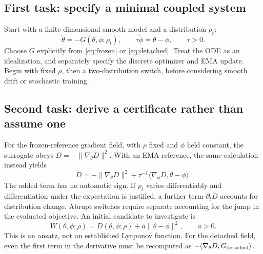 \documentclass[11pt,a4paper]{article}
\newif\ifdraftnotes
\newcommand{\draftnote}[1]{\ifdraftnotes\par\smallskip
  {\small\color{gray}\noindent\textit{To develop:} #1\par}\smallskip\fi}
\begin{document}
\subsection{First task: specify a minimal coupled system}
Start with a finite-dimensional smooth model and a distribution $\rho_t$:
\begin{equation}
 \dot\theta=-G(\theta,\phi;\rho_t),\qquad
 \tau\dot\phi=\theta-\phi,\qquad \tau>0.
 \label{eq:teacher}
\end{equation}
Choose $G$ explicitly from \eqref{eq:frozen} or \eqref{eq:detached}.
Treat the ODE as an idealization, and separately specify the discrete
optimizer and EMA update. Begin with fixed $\rho$, then a two-distribution
switch, before considering smooth drift or stochastic training.
\draftnote{Choose a scalar or low-dimensional affine model whose shared
parameters couple predictions on old and new inputs. Avoid a model in
which each input can adapt independently. State the adapted parameters
and the pretrained initialization.}

\subsection{Second task: derive a certificate rather than assume one}
For the frozen-reference gradient field, with $\rho$ fixed and $\phi$ held
constant, the surrogate obeys $\dot D=-\|\nabla_\theta D\|^2$.
With an EMA reference, the same calculation instead yields
\begin{equation}
 \dot D=-\|\nabla_\theta D\|^2
 +\tau^{-1}\langle\nabla_\phi D,\theta-\phi\rangle.
 \label{eq:emaenergy}
\end{equation}
The added term has no automatic sign. If $\rho_t$ varies differentiably and
differentiation under the expectation is justified, a further term
$\partial_tD$ accounts for distribution change. Abrupt switches require
separate accounting for the jump in the evaluated objective.
An initial candidate to investigate is
\begin{equation}
 W(\theta,\phi;\rho)
 =D(\theta,\phi;\rho)+a\|\theta-\phi\|^2,\qquad a>0.
 \label{eq:composite}
\end{equation}
This is an ansatz, not an established Lyapunov function. For the detached
field, even the first term in the derivative must be recomputed as
$-\langle\nabla_\theta D,G_{\rm detached}\rangle$.
\draftnote{Compute equilibria and the full Jacobian in the chosen toy model.
Determine whether a local certificate, a tracking bound, or a counterexample
is the most informative first result. Check boundedness and non-isolated
equilibria before claiming convergence to a point.}
\end{document}

